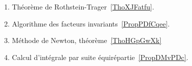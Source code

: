
\begin{enumerate}
	\item
	      Théorème de Rothstein-Trager~\ref{ThoXJFatfu}.
	\item
	      Algorithme des facteurs invariants~\ref{PropPDfCqee}.
	\item
	      Méthode de Newton, théorème~\ref{ThoHGpGwXk}
	\item
	      Calcul d'intégrale par suite équirépartie~\ref{PropDMvPDc}.
\end{enumerate}

